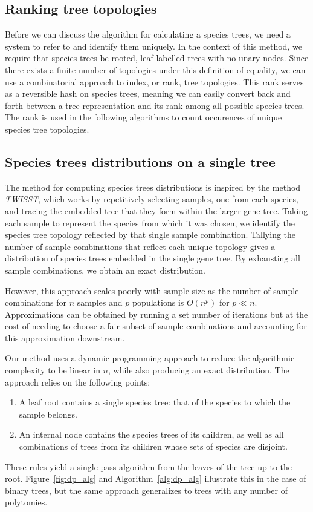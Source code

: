 \documentclass{article}
\newcommand{\twisst}{{\textit{TWISST}}}
\begin{document}
\subsection{Ranking tree topologies}

Before we can discuss the algorithm for calculating a species trees, we
need a system to refer to and identify them uniquely.
In the context of this method, we require that species trees be rooted,
leaf-labelled trees with no unary nodes.
Since there exists a finite number of topologies under this definition
of equality, we can use a combinatorial approach to index, or rank,
tree topologies.
This rank serves as a reversible hash on species trees, meaning we can
easily convert back and forth between a tree representation and its
rank among all possible species trees. The rank is used in the following
algorithms to count occurences of unique species tree topologies.

\subsection{Species trees distributions on a single tree}

The method for computing species trees distributions is inspired by the method
\twisst, which works
by repetitively selecting samples, one from each species, and tracing the
embedded tree that they form within the larger gene tree. Taking each
sample to represent the species from which it was chosen, we identify
the species tree topology reflected by that single sample combination.
Tallying the number of sample combinations that
reflect each unique topology gives a distribution of species trees
embedded in the single gene tree. By exhausting all sample combinations,
we obtain an exact distribution.

However, this approach scales poorly with sample size as the number
of sample combinations for $n$ samples and $p$ populations is $O(n^p)$ for
$p \ll n$. Approximations can be obtained by running a set number of iterations
but at the cost of needing to choose a fair subset of sample combinations and
accounting for this approximation downstream.

Our method uses a dynamic programming approach to reduce the algorithmic
complexity to be linear in $n$, while also producing an exact distribution.
The approach relies on the following points:
\begin{enumerate}
    \item A leaf root contains a single species tree: that of the species to
        which the sample belongs.
    \item An internal node contains the species trees of its children, as
        well as all combinations of trees from its children whose
        sets of species are disjoint.
\end{enumerate}
These rules yield a single-pass algorithm from the leaves of the tree
up to the root. Figure~\ref{fig:dp_alg} and Algorithm~\ref{alg:dp_alg}
illustrate this in the case of binary trees, but the same approach generalizes
to trees with any number of polytomies.
\end{document}
